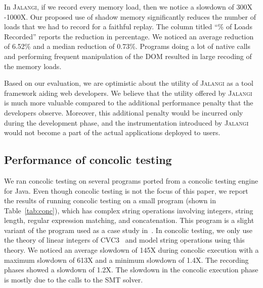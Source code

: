 \documentclass{sig-alternate}
\def\jalangi{\textsc{Jalangi}}
\begin{document}
In \jalangi{}, if we record every memory load, then we notice a
slowdown of 300X -1000X.  Our proposed use of shadow memory
significantly reduces the number of loads that we had to record for a
faithful replay.  The column titled ``\% of Loads Recorded'' reports
the reduction in percentage.  We noticed an average reduction of
6.52\% and a median reduction of 0.73\%.  Programs doing a lot of
native calls and performing frequent manipulation of the DOM resulted
in large recoding of the memory loads.


Based on our evaluation, we are optimistic about the utility of
\jalangi{} as a tool framework aiding web developers.  We believe that
the utility offered by \jalangi{} is much more valuable compared to
the additional performance penalty that the developers
observe. Moreover, this additional penalty would be incurred only
during the development phase, and the instrumentation introduced by
\jalangi{} would not become a part of the actual applications deployed
to users.

\subsection{Performance of concolic testing}
\label{sec:conc-test-small}

We ran concolic testing on several programs ported from a concolic
testing engine for Java.  Even though concolic testing is not the focus of
this paper, we report the results of running concolic testing on a
small program (shown in Table~\ref{tab:conc}), which has complex
string operations involving integers, string length, regular
expression matching, and concatenation.  This program is a slight
variant of the program used as a case study
in~\cite{Bjorner:2009:PFA:1532891.1532927}.  In concolic testing, we
only use the theory of linear integers of CVC3~\cite{BT07} and model
string operations using this theory.  %
We noticed an average slowdown of 145X during concolic
execution with a maximum slowdown of 613X and a minimum slowdown of
1.4X.  The recording phases showed a slowdown of 1.2X.  The slowdown
in the concolic execution phase is mostly due to the calls to the SMT
solver.
\end{document}
